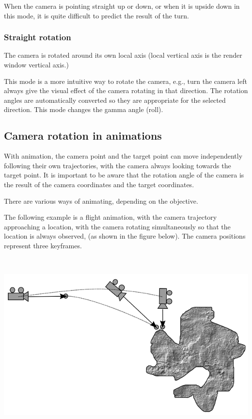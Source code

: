 When the camera is pointing straight up or down, or when it is upside
down in this mode, it is quite difficult to predict the result of the
turn.

\subsubsection{Straight rotation}\label{straight-rotation}

The camera is rotated around its own local axis (local vertical axis is
the render window vertical axis.)

This mode is a more intuitive way to rotate the camera, e.g., turn the
camera left always give the visual effect of the camera rotating in that
direction. The rotation angles are automatically converted so they are
appropriate for the selected direction. This mode changes the gamma
angle (roll).

\subsection{Camera rotation in
animations}\label{camera-rotation-in-animations}

With animation, the camera point and the target point can move
independently following their own trajectories, with the camera always
looking towards the target point. It is important to be aware that the
rotation angle of the camera is the result of the camera coordinates and
the target coordinates.

There are various ways of animating, depending on the objective.

The following example is a flight animation, with the camera trajectory
approaching a location, with the camera rotating simultaneously so that
the location is always observed, (as shown in the figure below). The
camera positions represent three keyframes.

\includegraphics[width=6.52292in,height=3.75556in]{img/manual/media/image18.png}

